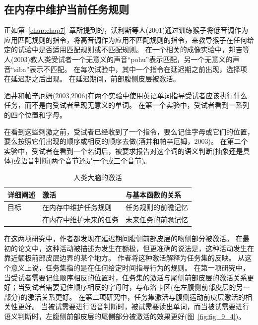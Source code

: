 \subsection{在内存中维护当前任务规则}
\par

正如第~\ref{chap:chap7}~章所提到的，沃利斯等人(2001)通过训练猴子将低音调作为应用匹配规则的指令，将高音调作为应用不匹配规则的指令，来教导猴子在任何给定的试验中是否适用匹配规则或不匹配规则。
在一个相关的成像实验中，邦吉等人(2003)教人类受试者一个无意义的声音“pohu”表示匹配，另一个无意义的声音“siba”表示不匹配。
在每次试验中，其中一个指令在延迟期之前出现，选择项在延迟期之后出现。
在延迟期间，前部腹侧皮层被激活。
\par


酒井和帕辛厄姆(2003,2006)在两个实验中使用英语单词指导受试者应该执行什么任务，而不是向受试者呈现无意义的单词。
在第一个实验中，受试者看到一系列的四个位置和字母。
\par


在看到这些刺激之前，受试者已经收到了一个指令，要么记住字母或它们的位置，要么按照它们出现的顺序或相反的顺序去做(酒井和帕辛厄姆，2003)。
在第二个实验中，受试者在看到一个名词后，被要求报告对这个词的语义判断(抽象还是具体)或语音判断(两个音节还是一个或三个音节)。


\begin{table}[htbp] 
	\newcommand{\tabincell}[2]{\begin{tabular}{@{}#1@{}}#2\end{tabular}} %
	\centering
	\caption{人类大脑的激活\label{tab:9_3}}
	\renewcommand\arraystretch{1.5}	%
	\begin{tabular}{lll}
		\toprule
		详细阐述 & 激活 & 与基本函数的关系\\
		\midrule
		目标 & 在内存中维护任务规则 & 任务规则的前瞻记忆  \\
		& 在内存中维护未来的任务 & 未来任务的前瞻记忆 \\
		\bottomrule
		
	\end{tabular}%
\end{table}%
\par


在这两项研究中，作者都发现在延迟期间腹侧前部皮层的吻侧部分被激活。
在最初的论文中，这种活动被描述为发生在额极，但更准确的说法是，这种活动发生在靠近额极前部皮层边界的某个地方。
作者将这种激活解释为任务集的反映。
从这个意义上说，任务集指的是在任何给定时间指导行为的规则。
在第一项研究中，当受试者需要记住顺序相反的位置时，任务集的激活与尾侧前部皮层的激活关系更好；当受试者需要记住顺序相反的字母时，与布洛卡区(在左腹侧前部皮层的另一部分)的激活关系更好。
在第二项研究中，任务集激活与腹侧运动前皮层激活的相关性更好。
当被试需要进行语音判断时，被试需要读出单词，而当被试需要进行语义判断时，左腹侧前部皮层的尾侧部分被激活的效果更好(图~\ref{fig:fig_9_4})。


